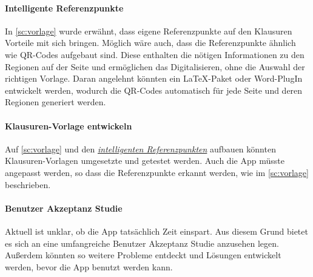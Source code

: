 \documentclass[notables, nomenclature, oneside, 150]{HSMW-Thesis}
\begin{document}
	\paragraph*{Intelligente Referenzpunkte}\label{pa:referenzpunkte}
		In \autoref{sc:vorlage} wurde erwähnt, dass eigene Referenzpunkte auf den Klausuren Vorteile mit sich bringen. Möglich wäre auch, dass die Referenzpunkte ähnlich wie QR-Codes aufgebaut sind. Diese enthalten die nötigen Informationen zu den Regionen auf der Seite und ermöglichen das Digitalisieren, ohne die Auswahl der richtigen Vorlage. Daran angelehnt könnten ein \LaTeX -Paket oder Word-PlugIn entwickelt werden, wodurch die QR-Codes automatisch für jede Seite und deren Regionen generiert werden. 
	
	\paragraph*{Klausuren-Vorlage entwickeln}
		Auf \autoref{sc:vorlage} und den \hyperref[pa:referenzpunkte]{\textit{intelligenten Referenzpunkten}} aufbauen könnten Klausuren-Vorlagen umgesetzte und getestet werden. Auch die App müsste angepasst werden, so dass die Referenzpunkte erkannt werden, wie im \autoref{sc:vorlage} beschrieben.
		
	\paragraph*{Benutzer Akzeptanz Studie}\label{pa:akzeptanz}
		Aktuell ist unklar, ob die App tatsächlich Zeit einspart. Aus diesem Grund bietet es sich an eine umfangreiche Benutzer Akzeptanz Studie anzusehen legen. Außerdem könnten so weitere Probleme entdeckt und Lösungen entwickelt werden, bevor die App benutzt werden kann.
	
	
\end{document}
